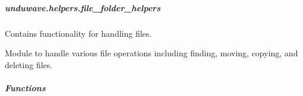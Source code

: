 \documentclass[letterpaper,10pt,english]{sphinxmanual}
\begin{document}
\sphinxstepscope


\subparagraph{unduwave.helpers.file\_folder\_helpers}
\label{\detokenize{autoapi/unduwave/helpers/file_folder_helpers/index:module-unduwave.helpers.file_folder_helpers}}\label{\detokenize{autoapi/unduwave/helpers/file_folder_helpers/index:unduwave-helpers-file-folder-helpers}}\label{\detokenize{autoapi/unduwave/helpers/file_folder_helpers/index::doc}}
\sphinxAtStartPar
Contains functionality for handling files.

\sphinxAtStartPar
Module to handle various file operations including finding, moving, copying, and deleting files.


\subparagraph{Functions}
\label{\detokenize{autoapi/unduwave/helpers/file_folder_helpers/index:functions}}
\end{document}
